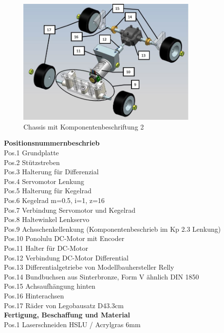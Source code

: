 \begin{figure}[H]%
\centering
\includegraphics[width=0.8\textwidth]{03_Loesungskonzept/pictures2/Explosion_Chassis_2_lg.JPG}
\caption{Chassis mit Komponentenbeschriftung 2}
\label{fig:activityRoute}
\end{figure}
\newpage
\textbf{Positionsnummernbeschrieb}\\[0.2cm]
Pos.1 	Grundplatte\\
Pos.2 	Stützstreben\\
Pos.3 	Halterung für Differenzial\\
Pos.4 	Servomotor Lenkung\\
Pos.5 	Halterung für Kegelrad\\
Pos.6 	Kegelrad m=0.5, i=1, z=16\\
Pos.7 	Verbindung Servomotor und Kegelrad\\
Pos.8	Haltewinkel Lenkservo\\
Pos.9	Achsschenkellenkung (Komponentenbeschrieb im Kp 2.3 Lenkung)\\
Pos.10	Ponolulu DC-Motor mit Encoder\\
Pos.11	Halter für DC-Motor\\
Pos.12	Verbindung DC-Motor Differential\\
Pos.13	Differentialgetriebe von Modellbauhersteller Relly\\
Pos.14	Bundbuchsen aus Sinterbronze, Form V ähnlich DIN 1850\\
Pos.15	Achsaufhängung hinten\\
Pos.16	Hinterachsen\\
Pos.17	Räder von Legobausatz D43.3cm\\[0.2cm]
\textbf{Fertigung, Beschaffung und Material}\\[0.2cm]
Pos.1 	Laserschneiden HSLU / Acrylgras 6mm\\
